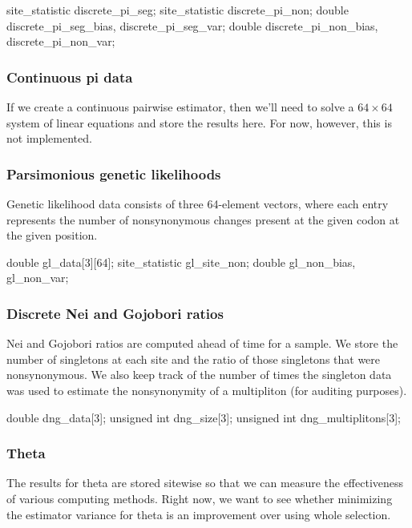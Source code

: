 \documentclass{article}
\begin{document}
\begin{ccode}
  site_statistic	discrete_pi_seg;
  site_statistic	discrete_pi_non;
  double		discrete_pi_seg_bias, discrete_pi_seg_var;
  double		discrete_pi_non_bias, discrete_pi_non_var;
\end{ccode}

      \subsubsection{Continuous pi data}

	If we create a continuous pairwise estimator, then we'll need to solve a
	$64 \times 64$ system of linear equations and store the results here.
	For now, however, this is not implemented.

      \subsubsection{Parsimonious genetic likelihoods}

	Genetic likelihood data consists of three 64-element vectors, where each
	entry represents the number of nonsynonymous changes present at the
	given codon at the given position.

\begin{ccode}
  double		gl_data[3][64];
  site_statistic	gl_site_non;
  double		gl_non_bias, gl_non_var;
\end{ccode}

      \subsubsection{Discrete Nei and Gojobori ratios}

	Nei and Gojobori ratios are computed ahead of time for a sample. We
	store the number of singletons at each site and the ratio of those
	singletons that were nonsynonymous. We also keep track of the number of
	times the singleton data was used to estimate the nonsynonymity of a
	multipliton (for auditing purposes).

\begin{ccode}
  double		dng_data[3];
  unsigned int		dng_size[3];
  unsigned int		dng_multiplitons[3];
\end{ccode}

      \subsubsection{Theta}

	The results for theta are stored sitewise so that we can measure the
	effectiveness of various computing methods. Right now, we want to see
	whether minimizing the estimator variance for theta is an improvement
	over using whole selection.
\end{document}
